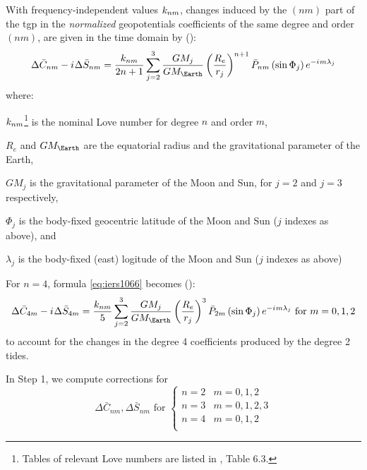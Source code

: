 With frequency-independent values $k _{nm}$, changes induced by the 
$(nm)$ part of the \gls{tgp} in the \emph{normalized} geopotentials 
coefficients of the same degree and order $(nm)$, are given in the time 
domain by (\cite{iers2010}):
\begin{equation}
\Delta \bar{C}_{nm} - \iim \Delta \bar{S}_{nm} = \frac{\lovek _{nm}}{2n+1}
  \sum^{3}_{j=2} \frac{GM_j}{GM_\Earth} \left( \frac{R_e}{r_j} \right) ^{n+1} 
  \bar{P}_{nm} \left( \sin \Phi _j \right) e^{-\iim m \lambda _j}
  \label{eq:iers1066}
\end{equation}
where:
\begin{description}
  \item $k _{nm}$\footnote{Tables of relevant Love numbers are listed 
    in \cite{iers2010}, Table 6.3.} is the nominal Love number for degree 
    $n$ and order $m$, 
  \item $R_e$ and $GM_{\Earth}$ are the equatorial radius and the 
    gravitational parameter of the Earth,
  \item $GM_j$ is the gravitational parameter of the Moon and Sun, for 
    $j=2$ and $j=3$ respectively,
  \item $\Phi _j$ is the body-fixed geocentric latitude of the Moon and 
    Sun ($j$ indexes as above), and
  \item $\lambda _j$ is the body-fixed (east) logitude of the Moon and 
    Sun ($j$ indexes as above)
\end{description}

For $n=4$, formula \ref{eq:iers1066} becomes (\cite{iers2010}):
\begin{equation}
\Delta \bar{C}_{4m} - \iim \Delta \bar{S}_{4m} = \frac{\lovek _{nm}}{5}
  \sum^{3}_{j=2} \frac{GM_j}{GM_\Earth} \left( \frac{R_e}{r_j} \right) ^{3} 
  \bar{P}_{2m} \left( \sin \Phi _j \right) e^{-\iim m \lambda _j} \text{ for } m=0,1,2
  \label{eq:iers1067}
\end{equation}
to account for the changes in the degree 4 coefficients produced by the 
degree 2 tides.

In Step 1, we compute corrections for 
\begin{equation}
  \Delta \bar{C}_{nm}, \Delta \bar{S}_{nm} \text{ for }
    \begin{cases}
      n=2 & m=0,1,2 \\
      n=3 & m=0,1,2,3 \\
      n=4 & m=0,1,2\\
    \end{cases}
\end{equation} 

